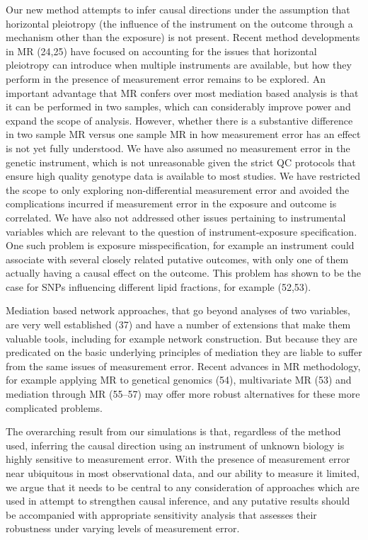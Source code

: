 \documentclass[]{article}
\begin{document}
Our new method attempts to infer causal directions under the assumption
that horizontal pleiotropy (the influence of the instrument on the
outcome through a mechanism other than the exposure) is not present.
Recent method developments in MR (24,25) have focused on accounting for
the issues that horizontal pleiotropy can introduce when multiple
instruments are available, but how they perform in the presence of
measurement error remains to be explored. An important advantage that MR
confers over most mediation based analysis is that it can be performed
in two samples, which can considerably improve power and expand the
scope of analysis. However, whether there is a substantive difference in
two sample MR versus one sample MR in how measurement error has an
effect is not yet fully understood. We have also assumed no measurement
error in the genetic instrument, which is not unreasonable given the
strict QC protocols that ensure high quality genotype data is available
to most studies. We have restricted the scope to only exploring
non-differential measurement error and avoided the complications
incurred if measurement error in the exposure and outcome is correlated.
We have also not addressed other issues pertaining to instrumental
variables which are relevant to the question of instrument-exposure
specification. One such problem is exposure misspecification, for
example an instrument could associate with several closely related
putative outcomes, with only one of them actually having a causal effect
on the outcome. This problem has shown to be the case for SNPs
influencing different lipid fractions, for example (52,53).

Mediation based network approaches, that go beyond analyses of two
variables, are very well established (37) and have a number of
extensions that make them valuable tools, including for example network
construction. But because they are predicated on the basic underlying
principles of mediation they are liable to suffer from the same issues
of measurement error. Recent advances in MR methodology, for example
applying MR to genetical genomics (54), multivariate MR (53) and
mediation through MR (55--57) may offer more robust alternatives for
these more complicated problems.

The overarching result from our simulations is that, regardless of the
method used, inferring the causal direction using an instrument of
unknown biology is highly sensitive to measurement error. With the
presence of measurement error near ubiquitous in most observational
data, and our ability to measure it limited, we argue that it needs to
be central to any consideration of approaches which are used in attempt
to strengthen causal inference, and any putative results should be
accompanied with appropriate sensitivity analysis that assesses their
robustness under varying levels of measurement error.
\end{document}
